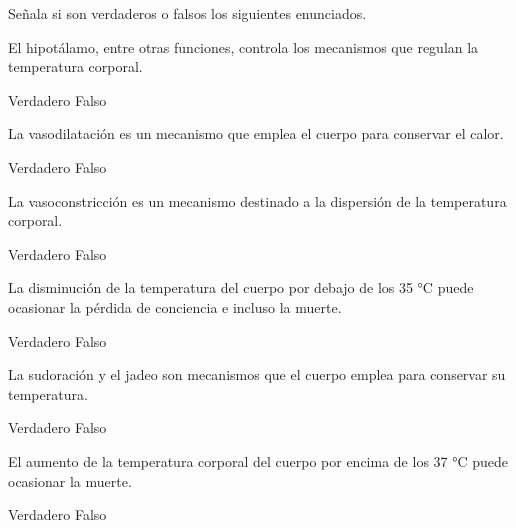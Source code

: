 Señala si son verdaderos o falsos los siguientes enunciados.
\begin{parts}
    El hipotálamo, entre otras funciones, controla los mecanismos que regulan la temperatura corporal.
        {\footnotesize
            \begin{choices}
                \choice Verdadero
                \choice Falso
            \end{choices}
        }

    La vasodilatación es un mecanismo que emplea el cuerpo para conservar el calor.
        {\footnotesize
            \begin{choices}
                \choice Verdadero
                \choice Falso
            \end{choices}
        }

    La vasoconstricción es un mecanismo destinado a la dispersión de la temperatura corporal.
        {\footnotesize
            \begin{choices}
                \choice Verdadero
                \choice Falso
            \end{choices}
        }

    La disminución de la temperatura del cuerpo por debajo de los 35 °C puede ocasionar la pérdida de conciencia e incluso la muerte.
        {\footnotesize
            \begin{choices}
                \choice Verdadero
                \choice Falso
            \end{choices}
        }

    La sudoración y el jadeo son mecanismos que el cuerpo emplea para conservar su temperatura.
        {\footnotesize
            \begin{choices}
                \choice Verdadero
                \choice Falso
            \end{choices}
        }

    El aumento de la temperatura corporal del cuerpo por encima de los 37 °C puede ocasionar la muerte.
        {\footnotesize
            \begin{choices}
                \choice Verdadero
                \choice Falso
            \end{choices}
        }
\end{parts}